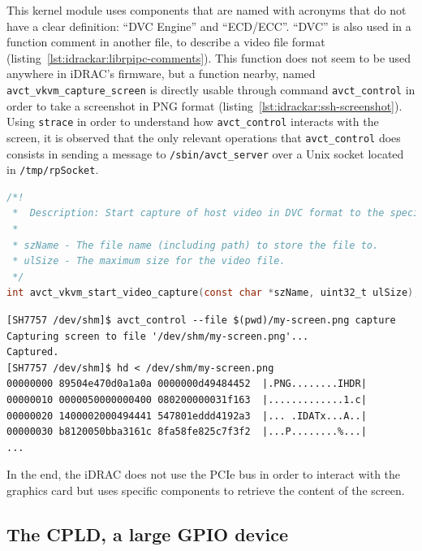 This kernel module uses components that are named with acronyms that do not have a clear definition: ``DVC Engine'' and ``ECD/ECC''.
``DVC'' is also used in a function comment in another file, to describe a video file format (listing~\ref{lst:idrackar:librpipc-comments}).
This function does not seem to be used anywhere in iDRAC's firmware, but a function nearby, named \texttt{avct\_vkvm\_capture\_screen} is directly usable through command \texttt{avct\_control} in order to take a screenshot in PNG format (listing~\ref{lst:idrackar:ssh-screenshot}).
Using \texttt{strace} in order to understand how \texttt{avct\_control} interacts with the screen, it is observed that the only relevant operations that \texttt{avct\_control} does consists in sending a message to \texttt{/sbin/avct\_server} over a Unix socket located in \texttt{/tmp/rpSocket}.

\begin{lstlisting}[language={C},caption={Extract from header file \texttt{ipk-dropbox/librpipc/image/usr/ include/librpipc/avct/rpipc.h}.},label={lst:idrackar:librpipc-comments}]
/*!
 *  Description: Start capture of host video in DVC format to the specified file.
 *
 * szName - The file name (including path) to store the file to.
 * ulSize - The maximum size for the video file.
 */
int avct_vkvm_start_video_capture(const char *szName, uint32_t ulSize);
\end{lstlisting}

\begin{lstlisting}[language={},caption={Screenshot from iDRAC's SSH.},label={lst:idrackar:ssh-screenshot}]
[SH7757 /dev/shm]$ avct_control --file $(pwd)/my-screen.png capture
Capturing screen to file '/dev/shm/my-screen.png'...
Captured.
[SH7757 /dev/shm]$ hd < /dev/shm/my-screen.png
00000000 89504e470d0a1a0a 0000000d49484452  |.PNG........IHDR|
00000010 0000050000000400 080200000031f163  |.............1.c|
00000020 1400002000494441 547801eddd4192a3  |... .IDATx...A..|
00000030 b8120050bba3161c 8fa58fe825c7f3f2  |...P........%...|
...
\end{lstlisting}

In the end, the iDRAC does not use the PCIe bus in order to interact with the graphics card but uses specific components to retrieve the content of the screen.


\subsection{The CPLD, a large GPIO device}

